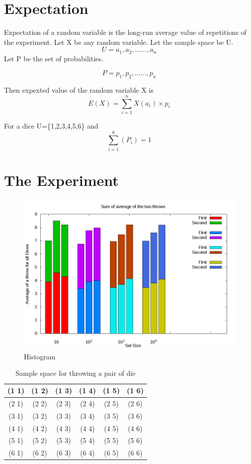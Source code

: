 \documentclass{article}
\begin{document}
\section{Expectation}
 Expectation of a random variable is the long-run average value of repetitions of the experiment. 
Let X be any random variable. Let the sample space be U.
$$U = {a_1,a_2,......,a_n}$$
Let P be the set of probabilities.

$$ P={p_1,p_2,......,p_n}$$

Then expexted value of the random variable X is
$$E(X) = \sum_{i=1}^{n}X(a_i) \times p_i$$

For a dice 
U=\{1,2,3,4,5,6\}
and $$ \sum_{i=1}^{6}(P_i)=1$$

\section{The Experiment}

\begin{figure}[!t]
        \begin{center}
                \includegraphics[width=0.8\columnwidth]{histforall.png}
        \end{center}
	\caption{Histogram}
	\label{fig:Sum of averages for dice 1,2,3 for different set sizes}
\end{figure}

\begin{table}[h]
    \centering
    \begin{tabular}{||c|c|c|c|c|c||}
 \hline       
(1 1) & (1 2)  & (1 3) & (1 4) & (1 5) & (1 6) \\
\hline
(2 1) & (2 2) & (2 3) & (2 4) & (2 5) & (2 6) \\
\hline
(3 1) & (3 2) & (3 3) & (3 4) & (3 5) & (3 6) \\
\hline
(4 1) & (4 2) & (4 3) & (4 4) & (4 5) & (4 6) \\
\hline
(5 1) & (5 2) & (5 3) & (5 4) & (5 5) & (5 6) \\
\hline
(6 1) & (6 2) & (6 3) & (6 4) & (6 5) & (6 6) \\
\hline 
    \end{tabular}
    \caption{Sample space for throwing a pair of die}
    \label{table:one}
\end{table}
\end{document}
